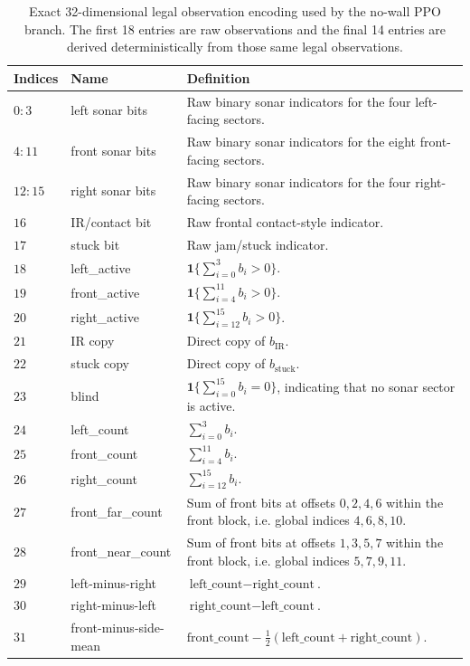 \documentclass[11pt, oneside]{article}   	%
\begin{document}
\begin{table}[H]
\centering
\small
\begin{tabular}{p{}p{}p{}}
\toprule
Indices & Name & Definition \\
\midrule
\(0\!:\!3\) & left sonar bits & Raw binary sonar indicators for the four left-facing sectors. \\
\(4\!:\!11\) & front sonar bits & Raw binary sonar indicators for the eight front-facing sectors. \\
\(12\!:\!15\) & right sonar bits & Raw binary sonar indicators for the four right-facing sectors. \\
\(16\) & IR/contact bit & Raw frontal contact-style indicator. \\
\(17\) & stuck bit & Raw jam/stuck indicator. \\
\(18\) & left\_active & \(\mathbf{1}\{\sum_{i=0}^{3} b_i > 0\}\). \\
\(19\) & front\_active & \(\mathbf{1}\{\sum_{i=4}^{11} b_i > 0\}\). \\
\(20\) & right\_active & \(\mathbf{1}\{\sum_{i=12}^{15} b_i > 0\}\). \\
\(21\) & IR copy & Direct copy of \(b_{\mathrm{IR}}\). \\
\(22\) & stuck copy & Direct copy of \(b_{\mathrm{stuck}}\). \\
\(23\) & blind & \(\mathbf{1}\{\sum_{i=0}^{15} b_i = 0\}\), indicating that no sonar sector is active. \\
\(24\) & left\_count & \(\sum_{i=0}^{3} b_i\). \\
\(25\) & front\_count & \(\sum_{i=4}^{11} b_i\). \\
\(26\) & right\_count & \(\sum_{i=12}^{15} b_i\). \\
\(27\) & front\_far\_count & Sum of front bits at offsets \(0,2,4,6\) within the front block, i.e. global indices \(4,6,8,10\). \\
\(28\) & front\_near\_count & Sum of front bits at offsets \(1,3,5,7\) within the front block, i.e. global indices \(5,7,9,11\). \\
\(29\) & left-minus-right & \(\text{left\_count} - \text{right\_count}\). \\
\(30\) & right-minus-left & \(\text{right\_count} - \text{left\_count}\). \\
\(31\) & front-minus-side-mean & \(\text{front\_count} - \tfrac{1}{2}(\text{left\_count}+\text{right\_count})\). \\
\bottomrule
\end{tabular}
\caption{Exact 32-dimensional legal observation encoding used by the no-wall PPO branch. The first 18 entries are raw observations and the final 14 entries are derived deterministically from those same legal observations.}
\label{tab:obs32}
\end{table}
\end{document}
